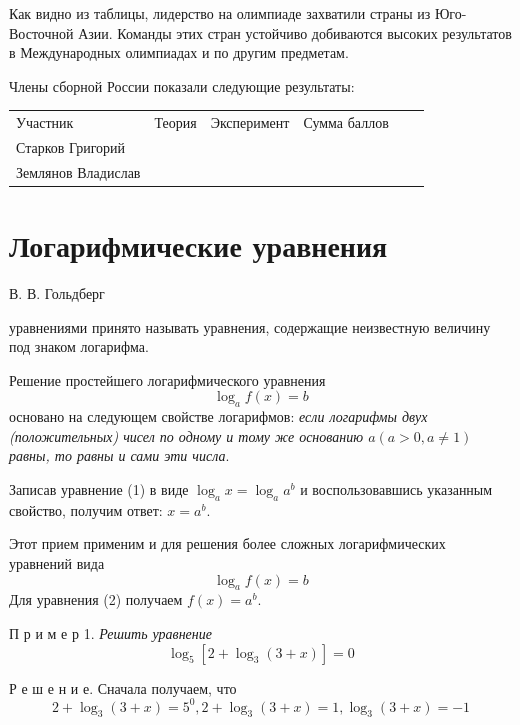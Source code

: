 \begin{multicols*}{2}
    Как видно из таблицы, лидерство на олимпиаде захватили страны из Юго-Восточной Азии. Команды этих стран устойчиво добиваются высоких результатов в Международных олимпиадах и по другим предметам.

    Члены сборной России показали следующие результаты:
    \begin{center}
        \begin{tabular}{p{1.9cm}p{1.3cm}p{2cm}p{1.1cm}p{2cm}c}
             Участник & Теория & Эксперимент & Сумма баллов & \centering{Медаль} & \\
             Старков Григорий & \centering{21,45} & \centering{14,00} & \centering{35,45} & \centering{золото} & \\
             
             Землянов Владислав & \centering{20,60} & \centering{13,65} & \centering{34,75} & \centering{золото} & \\
             
        \end{tabular}
    \end{center}
\end{multicols*}

\section*{\centering Логарифмические уравнения}
\flushright В. В. Гольдберг

 уравнениями принято называть уравнения, содержащие неизвестную величину под знаком логарифма.

Решение простейшего логарифмического уравнения
\begin{equation}
    \log_af(x)=b
\end{equation}
основано на следующем свойстве логарифмов: \textit{если логарифмы двух (положительных) чисел по одному и тому же основанию $a(a>0, a\neq1)$ равны, то равны и сами эти числа}.

Записав уравнение (1) в виде $\log_ax=\log_aa^b$ и воспользовавшись указанным свойство, получим ответ: $x=a^b$.

Этот прием применим и для решения более сложных логарифмических уравнений вида
\begin{equation}
    \log_af(x)=b
\end{equation}
Для уравнения (2) получаем $f(x)=a^b$.

П р и м е р 1. \textit{Решить уравнение}
\begin{equation*}
    \log_5[2+\log_3(3+x)]=0
\end{equation*}

Р е ш е н и е. Сначала получаем, что
\begin{equation*}
    2+\log_3(3+x)=5^0, 2+\log_3(3+x)=1,\log_3(3+x)=-1
\end{equation*}